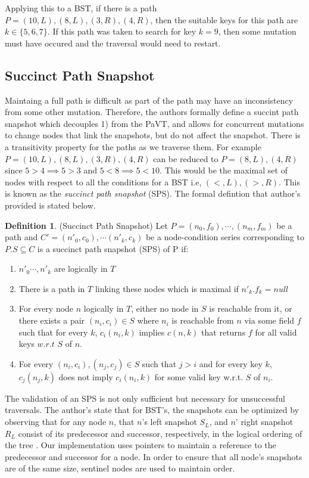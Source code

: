 \documentclass[11pt]{article}
\theoremstyle{definition}
\newtheorem{definition}{Definition}[section]
\theoremstyle{theorem}
\begin{document}
Applying this to a BST, if there is a path $P=(10,L),(8,L),(3,R),(4,R)$, then the suitable keys for this path are $k\in\{5, 6, 7\}$. If this path was taken to search for key $k=9$, then some mutation must have occured and the traversal would need to restart.   

\subsection{Succinct Path Snapshot}
Maintaing a full path is difficult as part of the path may have an inconsistency from some other mutation. Therefore, the authors formally define a succint path snapshot which decouples 1) from the PaVT, and allows for concurrent mutations to change nodes that link the snapshots, but do not affect the snapshot. There is a transitivity property for the paths as we traverse them. For example $P=(10,L),(8,L),(3,R),(4,R)$  can be reduced to $P=(8,L),(4,R)$ since $5>4 \implies 5 > 3$  and $5<8 \implies 5<10$. This would be the maximal set of nodes with respect to all the conditions for a BST i.e, $(<,L), (>, R)$. This is known as the \textit{succinct path snapshot} (SPS). The formal defintion that author's provided is stated below.
\theoremstyle{definition}
\begin{definition}{(Succinct Path Snapshot)} Let $P = (n_0, f_0),\cdots,(n_m, f_m)$ be a path and $C'=(n'_0, c_0),\cdots (n'_k, c_k)$ be a node-condition series corresponding to $P.S\subseteq C$ is a succinct path snapshot (SPS) of P if:
\begin{enumerate}
	\item $n'_0\cdots, n'_k$ are logically in $T$
	\item There is a path in $T$ linking these nodes which is maximal if $n'_k.f_k = null$
	\item For every node $n$ logically in $T$, either no node in $S$ is reachable from it, or there exists a pair $(n_i, c_i) \in S$ where $n_i$ is reachable from $n$ via some field $f$ such that for every $k$, $c_i(n_i, k)$ implies $c(n, k)$ that returns $f$ for all valid keys $w.r.t$ $S$ of $n$.
	\item For every $(n_i, c_i), (n_j, c_j) \in S$ such that $j > i$ and for every key $k$, $c_j(n_j, k)$ does not imply $c_i(n_i, k)$ for some valid key w.r.t. $S$ of $n_i$.
\end{enumerate}
\end{definition}
The validation of an SPS is not only sufficient but necessary for unsuccessful traversals. The author's state that for BST's, the snapshots can be optimized by observing that for any node $n$, that $n$'s left snapshot $S_L$, and $n$' right snapshot $R_L$ consist of its predecessor and successor, respectively,  in the logical ordering of the tree \cite{draschler-lo}. Our implementation uses pointers to maintain a reference to the predecessor and successor for a node. In order to ensure that all node's snapshots are of the same size, sentinel nodes are used to maintain order.
\end{document}
